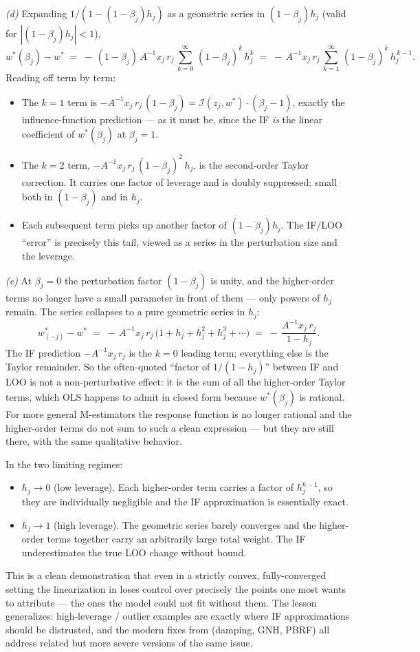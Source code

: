 \documentclass[11pt]{article}
\begin{document}
\begin{solution}[ex:ols-if]
\textit{(d)} Expanding $1/(1-(1-\beta_j) h_j)$ as a geometric series in $(1-\beta_j) h_j$ (valid for $|(1-\beta_j) h_j| < 1$),
\[
  w^*(\beta_j) - w^* \;=\; -\,(1-\beta_j)\,A^{-1} x_j\,r_j\,\sum_{k=0}^{\infty}\,(1-\beta_j)^{k}\,h_j^{k} \;=\; -\,A^{-1} x_j\,r_j\,\sum_{k=1}^{\infty}\,(1-\beta_j)^{k}\,h_j^{\,k-1}.
\]
Reading off term by term:
\begin{itemize}
  \item The $k=1$ term is $-A^{-1} x_j\,r_j\,(1-\beta_j) = \mathcal{I}(z_j,w^*)\cdot(\beta_j - 1)$, exactly the influence-function prediction --- as it must be, since the IF \emph{is} the linear coefficient of $w^*(\beta_j)$ at $\beta_j = 1$.
  \item The $k=2$ term, $-A^{-1} x_j\,r_j\,(1-\beta_j)^2\,h_j$, is the second-order Taylor correction. It carries one factor of leverage and is doubly suppressed: small both in $(1-\beta_j)$ and in $h_j$.
  \item Each subsequent term picks up another factor of $(1-\beta_j) h_j$. The IF/LOO ``error'' is precisely this tail, viewed as a series in the perturbation size and the leverage.
\end{itemize}

\textit{(e)} At $\beta_j = 0$ the perturbation factor $(1-\beta_j)$ is unity, and the higher-order terms no longer have a small parameter in front of them --- only powers of $h_j$ remain. The series collapses to a pure geometric series in $h_j$:
\[
  w^*_{(-j)} - w^* \;=\; -\,A^{-1} x_j\,r_j\,\bigl(1 + h_j + h_j^{2} + h_j^{3} + \cdots\bigr) \;=\; -\,\frac{A^{-1} x_j\,r_j}{1 - h_j}.
\]
The IF prediction $-A^{-1} x_j\,r_j$ is the $k=0$ leading term; everything else is the Taylor remainder. So the often-quoted ``factor of $1/(1-h_j)$'' between IF and LOO is not a non-perturbative effect: it is the sum of all the higher-order Taylor terms, which OLS happens to admit in closed form because $w^*(\beta_j)$ is rational. For more general M-estimators the response function is no longer rational and the higher-order terms do not sum to such a clean expression --- but they are still there, with the same qualitative behavior.

In the two limiting regimes:
\begin{itemize}
  \item $h_j \to 0$ (low leverage). Each higher-order term carries a factor of $h_j^{k-1}$, so they are individually negligible and the IF approximation is essentially exact.
  \item $h_j \to 1$ (high leverage). The geometric series barely converges and the higher-order terms together carry an arbitrarily large total weight. The IF underestimates the true LOO change without bound.
\end{itemize}
This is a clean demonstration that even in a strictly convex, fully-converged setting the linearization in  loses control over precisely the points one most wants to attribute --- the ones the model could not fit without them. The lesson generalizes: high-leverage / outlier examples are exactly where IF approximations should be distrusted, and the modern fixes from  (damping, GNH, PBRF) all address related but more severe versions of the same issue.


\end{solution}
\end{document}
